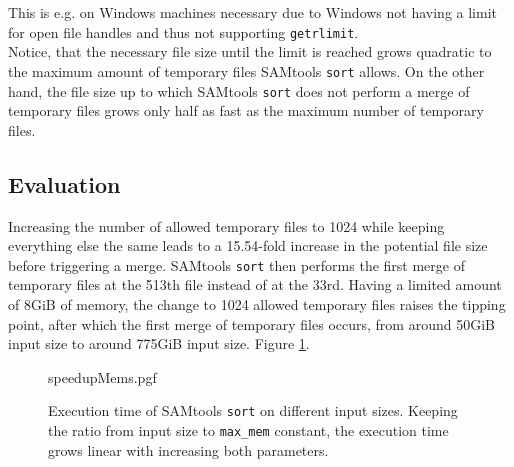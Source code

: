This is e.g. on Windows machines necessary due to Windows not having a limit for open file handles and thus not supporting \texttt{getrlimit}. \\
Notice, that the necessary file size until the limit is reached grows quadratic to the maximum amount of temporary files SAMtools \texttt{sort} allows. On the other hand, the file size up to which SAMtools \texttt{sort} does not perform a merge of temporary files grows only half as fast as the maximum number of temporary files.

\subsection{Evaluation}
Increasing the number of allowed temporary files to 1024 while keeping everything else the same leads to a 15.54-fold increase in the potential file size before triggering a merge. SAMtools \texttt{sort} then performs the first merge of temporary files at the 513th file instead of at the 33rd. Having a limited amount of 8GiB of memory, the change to 1024 allowed temporary files raises the tipping point, after which the first merge of temporary files occurs, from around 50GiB input size to around 775GiB input size. Figure 
\ref{fig:memSpeedup}.\\
\begin{figure}
        {speedupMems.pgf}
    \caption{Execution time of SAMtools \texttt{sort} on different input sizes. Keeping the ratio from input size to \texttt{max\_mem} constant, the execution time grows linear with increasing both parameters.}
    \label{fig:memSpeedup}
\end{figure}